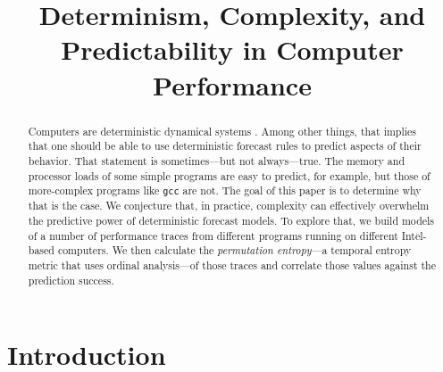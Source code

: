\documentclass{article}
\title{Determinism, Complexity, and Predictability in Computer Performance}
\begin{document}
\maketitle





\begin{abstract}
  Computers are deterministic dynamical systems \cite{mytkowicz09}.
  Among other things, that implies that one should be able to use
  deterministic forecast rules to predict aspects of their behavior.
  That statement is sometimes---but not always---true. The memory and
  processor loads of some simple programs are easy to predict, for
  example, but those of more-complex programs like {\tt gcc} are not.
  The goal of this paper is to determine why that is the case. We
  conjecture that, in practice, complexity can effectively overwhelm
  the predictive power of deterministic forecast models. To explore
  that, we build models of a number of performance traces from
  different programs running on different Intel-based computers. We
  then calculate the \emph{permutation entropy}---a temporal entropy
  metric that uses ordinal analysis---of those traces and correlate
  those values against the prediction success.
\end{abstract}

\section{Introduction}
\end{document}
